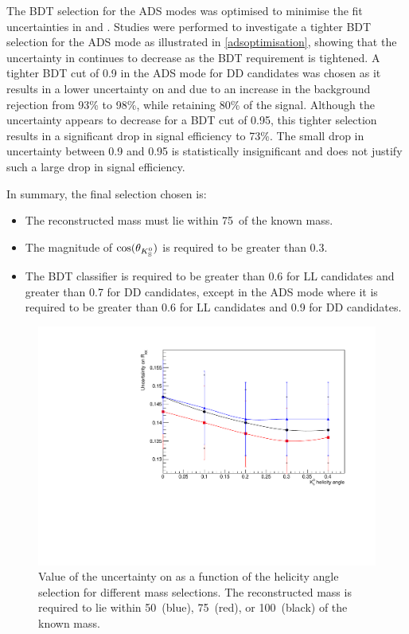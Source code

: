 The BDT selection for the ADS modes was optimised to minimise the fit uncertainties in \Rptwo and \Rmtwo. Studies were performed to investigate a tighter BDT selection for the ADS mode as illustrated in \fig\ref{adsoptimisation}, showing that the uncertainty in \Rptwo continues to decrease as the BDT requirement is tightened. A tighter BDT cut of 0.9 in the ADS mode for DD candidates was chosen as it results in a lower uncertainty on \Rptwo and \Rmtwo due to an increase in the background rejection from 93\% to 98\%, while retaining 80\% of the signal. Although the uncertainty appears to decrease for a BDT cut of 0.95, this tighter selection results in a significant drop in signal efficiency to 73\%. The small drop in uncertainty between 0.9 and 0.95 is statistically insignificant and does not justify such a large drop in signal efficiency. 

In summary, the final selection chosen is:

\begin{itemize}
\item{The reconstructed \Kstarm mass must lie within 75~\mevcc of the known \Kstarm mass.}
\item{The magnitude of $\cos(\theta_{{{K}^0_{\mathrm{ \scriptscriptstyle S}}}})$ is required to be greater than 0.3.}
\item{The BDT classifier is required to be greater than 0.6 for LL candidates and greater than 0.7 for DD candidates, except in the ADS mode where it is required to be greater than 0.6 for LL candidates and 0.9 for DD candidates.}
\end{itemize}

\begin{figure}
\centering
\includegraphics[width=0.8\linewidth]{figures/selection/optimisation.pdf}
\caption{Value of the uncertainty on \Rkk as a function of the \KS helicity angle selection for different \Kstar mass selections. The reconstructed \Kstarm mass is required to lie within 50~\mevcc (blue), 75~\mevcc (red), or 100~\mevcc (black) of the known \Kstar mass.}
\label{optimisation}
\end{figure}

